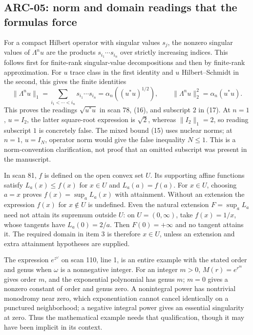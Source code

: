 \documentclass[11pt,a4paper]{article}
\begin{document}
\subsection{ARC-05: norm and domain readings that the formulas force}
For a compact Hilbert operator with singular values $s_j$, the nonzero singular values of $\Lambda^n u$ are the products $s_{i_1}\cdots s_{i_n}$ over strictly increasing indices. This follows first for finite-rank singular-value decompositions and then by finite-rank approximation. For $u$ trace class in the first identity and $u$ Hilbert--Schmidt in the second, this gives the finite identities
\[
 \|\Lambda^n u\|_1=\sum_{i_1<\cdots<i_n}s_{i_1}\cdots s_{i_n}
 =\alpha_n((u^*u)^{1/2}),\qquad
 \|\Lambda^n u\|_2^2=\alpha_n(u^*u).
\]
This proves the readings $\sqrt{u^*u}$ in scan 78, (16), and subscript $2$ in (17). At $n=1$, $u=I_2$, the latter square-root expression is $\sqrt2$, whereas $\|I_2\|_1=2$, so reading subscript $1$ is concretely false. The mixed bound (15) uses nuclear norms; at $n=1$, $u=I_N$, operator norm would give the false inequality $N\le1$. This is a norm-convention clarification, not proof that an omitted subscript was present in the manuscript.

In scan 81, $f$ is defined on the open convex set $U$. Its supporting affine functions satisfy $L_a(x)\le f(x)$ for $x\in U$ and $L_a(a)=f(a)$. For $x\in U$, choosing $a=x$ proves $f(x)=\sup_aL_a(x)$ with attainment. Without an extension the expression $f(x)$ for $x\notin U$ is undefined. Even the natural extension $F=\sup_aL_a$ need not attain its supremum outside $U$: on $U=(0,\infty)$, take $f(x)=1/x$, whose tangents have $L_a(0)=2/a$. Then $F(0)=+\infty$ and no tangent attains it. The required domain in item 3 is therefore $x\in U$, unless an extension and extra attainment hypotheses are supplied.

The expression $e^{z^\omega}$ on scan 110, line 1, is an entire example with the stated order and genus when $\omega$ is a nonnegative integer. For an integer $m>0$, $M(r)=e^{r^m}$ gives order $m$, and the exponential polynomial has genus $m$; $m=0$ gives a nonzero constant of order and genus zero. A nonintegral power has nontrivial monodromy near zero, which exponentiation cannot cancel identically on a punctured neighborhood; a negative integral power gives an essential singularity at zero. Thus the mathematical example needs that qualification, though it may have been implicit in its context.
\end{document}

